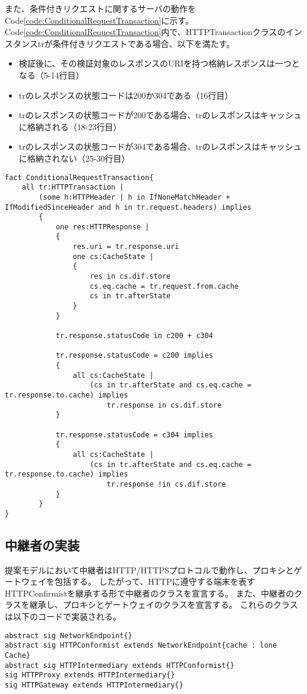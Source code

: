 \documentclass[journal]{IEEEtran}
\begin{document}
また、条件付きリクエストに関するサーバの動作をCode\ref{code:ConditionalRequestTransaction}に示す。
Code\ref{code:ConditionalRequestTransaction}内で、HTTPTransactionクラスのインスタンスtrが条件付きリクエストである場合、以下を満たす。
\begin{itemize}
\item 検証後に、その検証対象のレスポンスのURIを持つ格納レスポンスは一つとなる（5-14行目）
\item trのレスポンスの状態コードは200か304である（16行目）
\item trのレスポンスの状態コードが200である場合、trのレスポンスはキャッシュに格納される（18-23行目）
\item trのレスポンスの状態コードが304である場合、trのレスポンスはキャッシュに格納されない（25-30行目）
\end{itemize}

\begin{lstlisting}[caption=条件付きリクエストに対するサーバの動作, label=code:ConditionalRequestTransaction]
fact ConditionalRequestTransaction{
	all tr:HTTPTransaction |
		(some h:HTTPHeader | h in IfNoneMatchHeader + IfModifiedSinceHeader and h in tr.request.headers) implies
		{
			one res:HTTPResponse |
			{
				res.uri = tr.response.uri
				one cs:CacheState |
				{
					res in cs.dif.store
					cs.eq.cache = tr.request.from.cache
					cs in tr.afterState
				}
			}

			tr.response.statusCode in c200 + c304

			tr.response.statusCode = c200 implies
			{
				all cs:CacheState |
					(cs in tr.afterState and cs.eq.cache = tr.response.to.cache) implies
						tr.response in cs.dif.store
			}

			tr.response.statusCode = c304 implies
			{
				all cs:CacheState |
					(cs in tr.afterState and cs.eq.cache = tr.response.to.cache) implies
						tr.response !in cs.dif.store
			}
		}
}
\end{lstlisting}

\subsection{中継者の実装}
提案モデルにおいて中継者はHTTP/HTTPSプロトコルで動作し、プロキシとゲートウェイを包括する。
したがって、HTTPに遵守する端末を表すHTTPConfirmistを継承する形で中継者のクラスを宣言する。
また、中継者のクラスを継承し、プロキシとゲートウェイのクラスを宣言する。
これらのクラスは以下のコードで実装される。

\begin{lstlisting}[caption=中継者、プロキシ、ゲートウェイのクラス, label=code:IntermediaryClass]
abstract sig NetworkEndpoint{}
abstract sig HTTPConformist extends NetworkEndpoint{cache : lone Cache}
abstract sig HTTPIntermediary extends HTTPConformist{}
sig HTTPProxy extends HTTPIntermediary{}
sig HTTPGateway extends HTTPIntermediary{}
\end{lstlisting}
\end{document}

